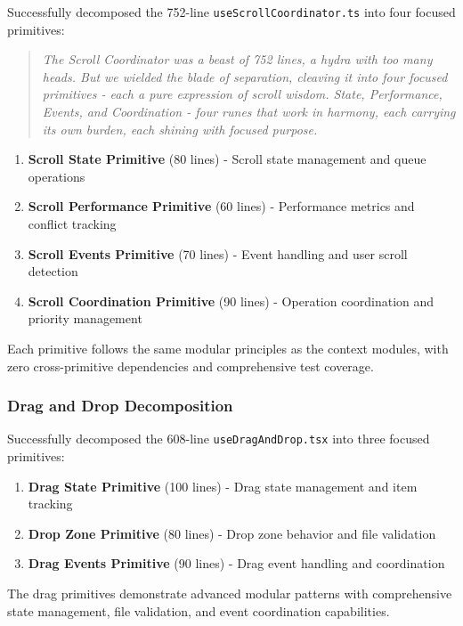 \documentclass[11pt]{article}
\begin{document}
Successfully decomposed the 752-line \texttt{useScrollCoordinator.ts} into four focused primitives:

\begin{quote}
\emph{The Scroll Coordinator was a beast of 752 lines, a hydra with too many heads. But we wielded the blade of separation, cleaving it into four focused primitives - each a pure expression of scroll wisdom. State, Performance, Events, and Coordination - four runes that work in harmony, each carrying its own burden, each shining with focused purpose.}
\end{quote}

\begin{enumerate}
\item \textbf{Scroll State Primitive} (80 lines) - Scroll state management and queue operations
\item \textbf{Scroll Performance Primitive} (60 lines) - Performance metrics and conflict tracking
\item \textbf{Scroll Events Primitive} (70 lines) - Event handling and user scroll detection
\item \textbf{Scroll Coordination Primitive} (90 lines) - Operation coordination and priority management
\end{enumerate}

Each primitive follows the same modular principles as the context modules, with zero cross-primitive dependencies and comprehensive test coverage.

\subsubsection{Drag and Drop Decomposition}

Successfully decomposed the 608-line \texttt{useDragAndDrop.tsx} into three focused primitives:

\begin{enumerate}
\item \textbf{Drag State Primitive} (100 lines) - Drag state management and item tracking
\item \textbf{Drop Zone Primitive} (80 lines) - Drop zone behavior and file validation
\item \textbf{Drag Events Primitive} (90 lines) - Drag event handling and coordination
\end{enumerate}

The drag primitives demonstrate advanced modular patterns with comprehensive state management, file validation, and event coordination capabilities.
\end{document}
